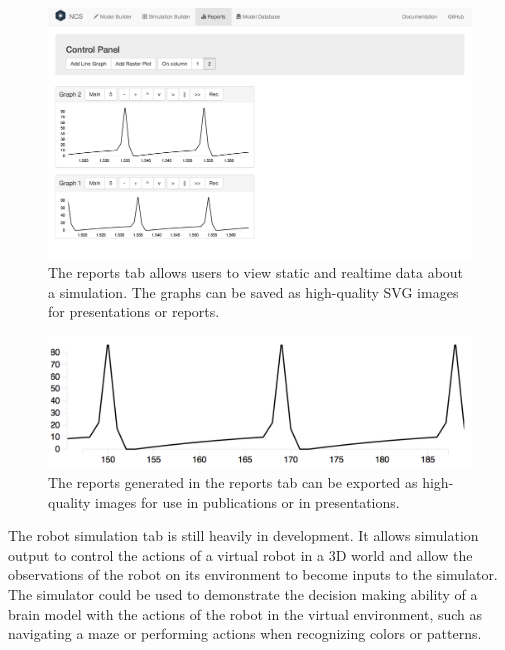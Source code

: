 \begin{figure}
\begin{center}
\includegraphics[height=\textheight,width=5in,keepaspectratio]{figures/reports.png}
\caption[Reports]{The reports tab allows users to view static and realtime data about a simulation. The graphs can be saved as high-quality SVG images for presentations or reports.\label{fig:reports}}
\end{center}
\end{figure}

\begin{figure}
\begin{center}
\includegraphics[height=\textheight,width=5in,keepaspectratio]{figures/report_graph.png}
\caption[Report Graph]{The reports generated in the reports tab can be exported as high-quality images for use in publications or in presentations.\label{fig:report_graph}}
\end{center}
\end{figure}

The robot simulation tab is still heavily in development. It allows simulation output to control the actions of a virtual robot in a 3D world and allow the observations of the robot on its environment to become inputs to the simulator. The simulator could be used to demonstrate the decision making ability of a brain model with the actions of the robot in the virtual environment, such as navigating a maze or performing actions when recognizing colors or patterns.







